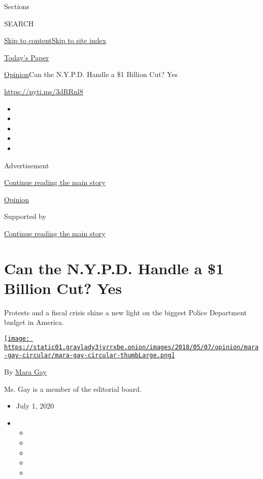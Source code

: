 Sections

SEARCH

\protect\hyperlink{site-content}{Skip to
content}\protect\hyperlink{site-index}{Skip to site index}

\href{https://myaccount.nytimes3xbfgragh.onion/auth/login?response_type=cookie\&client_id=vi}{}

\href{https://www.nytimes3xbfgragh.onion/section/todayspaper}{Today's
Paper}

\href{/section/opinion}{Opinion}\textbar{}Can the N.Y.P.D. Handle a \$1
Billion Cut? Yes

\url{https://nyti.ms/3dRRnl8}

\begin{itemize}
\item
\item
\item
\item
\item
\end{itemize}

Advertisement

\protect\hyperlink{after-top}{Continue reading the main story}

\href{/section/opinion}{Opinion}

Supported by

\protect\hyperlink{after-sponsor}{Continue reading the main story}

\hypertarget{can-the-nypd-handle-a-1-billion-cut-yes}{%
\section{Can the N.Y.P.D. Handle a \$1 Billion Cut?
Yes}\label{can-the-nypd-handle-a-1-billion-cut-yes}}

Protests and a fiscal crisis shine a new light on the biggest Police
Department budget in America.

\href{https://www.nytimes3xbfgragh.onion/by/mara-gay}{\texttt{[image: https://static01.graylady3jvrrxbe.onion/images/2018/05/07/opinion/mara-gay-circular/mara-gay-circular-thumbLarge.png]}}

By \href{https://www.nytimes3xbfgragh.onion/by/mara-gay}{Mara Gay}

Ms. Gay is a member of the editorial board.

\begin{itemize}
\item
  July 1, 2020
\item
  \begin{itemize}
  \item
  \item
  \item
  \item
  \item
  \end{itemize}
\end{itemize}

